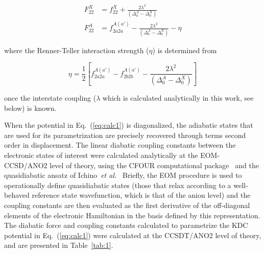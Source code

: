 \documentclass[journal=jpcafh,manuscript=article,layout=onecolumn, 12pt]{achemso}
\begin{document}
\begin{align}
F_{22}^X &= f_{22}^X+\frac{2\lambda^2}{(\Delta_0^A-\Delta_0^X)}\\
F_{22}^A &= f_{2a2a}^{A(a')}-\frac{2\lambda^2}{(\Delta_0^A-\Delta_0^X)}-\eta
\label{eq:calc2}
\end{align}

where the Renner-Teller interaction strength ($\eta$) is determined from 

\begin{equation}
\eta = \frac{1}{2}\left[ f_{2a2a}^{A(a')}-f_{2b2b}^{A(a')}-\frac{2\lambda^2}{(\Delta_0^A-\Delta_0^X)}\right]
\label{eq:calc3}
\end{equation}

once the interstate coupling ($\lambda$ which is calculated analytically in this work, see below) is known.

When the potential in Eq.~(\ref{eq:calc1}) is diagonalized, the adiabatic states that are used for its parametrization are precisely recovered through terms second order in displacement. The linear diabatic coupling constants between the electronic states of interest were calculated analytically at the EOM-CCSD/ANO2 level of theory, using the CFOUR computational package~\cite{dev20} and the quasidiabatic ansatz of Ichino~\emph{et al.}~\cite{ich09} Briefly, the EOM procedure is used to operationally define quasidiabatic states (those that relax according to a well-behaved reference state wavefunction, which is that of the anion level) and the coupling constants are then evaluated as the first derivative of the off-diagonal elements of the electronic Hamiltonian in the basis defined by this representation. The diabatic force and coupling constants calculated to parametrize the KDC potential in Eq.~(\ref{eq:calc1}) were calculated at the CCSDT/ANO2 level of theory, and are presented in Table~\ref{tab:1}.


\end{document}
